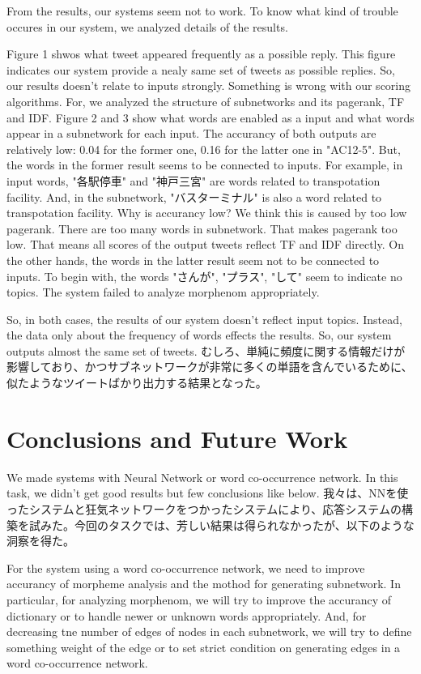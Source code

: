 \documentclass{../style/sig-alternate}
\begin{document}
From the results, our systems seem not to work. To know what kind of trouble occures in our system, we analyzed details of the results.


Figure 1 shwos what tweet appeared frequently as a possible reply. This figure indicates our system provide a nealy same set of tweets as possible replies. So, our results doesn't relate to inputs strongly. Something is wrong with our scoring algorithms. For, we analyzed the structure of subnetworks and its pagerank, TF and IDF.
Figure 2 and 3 show what words are enabled as a input and what words appear in a subnetwork for each input.
The accurancy of both outputs are relatively low: 0.04 for the former one, 0.16 for the latter one in "AC12-5". But, the words in the former result seems to be connected to inputs. For example, in input words, "各駅停車" and "神戸三宮" are words related to transpotation facility. And, in the subnetwork, "バスターミナル" is also a word related to transpotation facility. Why is accurancy low? We think this is caused by too low pagerank. There are too many words in subnetwork. That makes pagerank too low. That means all scores of the output tweets reflect TF and IDF directly.
On the other hands, the words in the latter result seem not to be connected to inputs. To begin with, the words "さんが", "プラス", "して" seem to indicate no topics. The system failed to analyze morphenom appropriately.

So, in both cases, the results of our system doesn't reflect input topics. Instead, the data only about the frequency of words effects the results. So, our system outputs almost the same set of tweets. むしろ、単純に頻度に関する情報だけが影響しており、かつサブネットワークが非常に多くの単語を含んでいるために、似たようなツイートばかり出力する結果となった。

\section{Conclusions and Future Work}
\label{sec:conclusions}
We made systems with Neural Network or word co-occurrence network. In this task, we didn't get good results but few conclusions like below.
我々は、NNを使ったシステムと狂気ネットワークをつかったシステムにより、応答システムの構築を試みた。今回のタスクでは、芳しい結果は得られなかったが、以下のような洞察を得た。

For the system using a word co-occurrence network, we need to improve accurancy of morpheme analysis and the mothod for generating subnetwork.
In particular, for analyzing morphenom, we will try to improve the accurancy of dictionary or to handle newer or unknown words appropriately. And, for decreasing tne number of edges of nodes in each subnetwork, we will try to define something weight of the edge or to set strict condition on generating edges in a word co-occurrence network.
\end{document}
